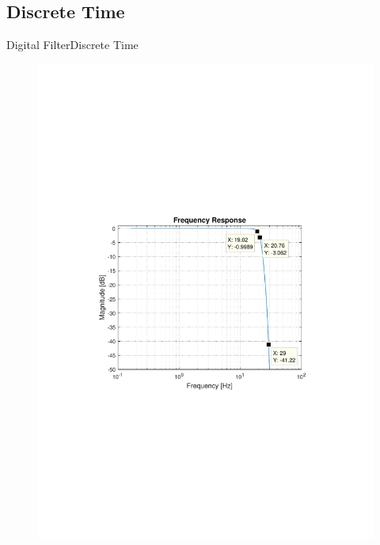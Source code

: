 \subsection{Discrete Time}
\begin{frame}{Digital Filter}{Discrete Time}
  \vspace{-4cm}
    \begin{figure}
    \hspace{-.8cm}
      	\includegraphics[scale = .5]{Pictures/DiscreteFrequencyResponse.pdf}
    \end{figure}
\end{frame}

